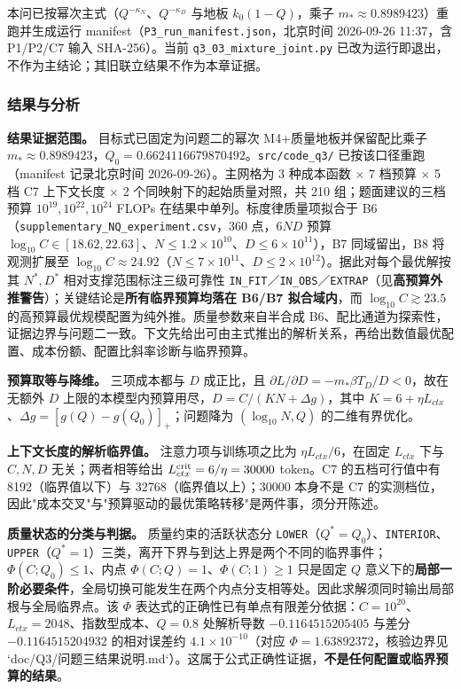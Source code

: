 本问已按幂次主式（$Q^{-\kappa_N}$、$Q^{-\kappa_D}$ 与地板 $k_0(1-Q)$，乘子 $m_*\approx0.8989423$）重跑并生成运行 manifest（\texttt{P3\_run\_manifest.json}，北京时间 2026-09-26 11:37，含 P1/P2/C7 输入 SHA-256）。当前 \texttt{q3\_03\_mixture\_joint.py} 已改为运行即退出，不作为主结论；其旧联立结果不作为本章证据。

\subsubsection{结果与分析}
\label{sec:5.4.3}

\textbf{结果证据范围。} 目标式已固定为问题二的幂次 M4+质量地板并保留配比乘子 $m_*\approx0.8989423$，$Q_0=0.6624116679870492$。\texttt{src/code\_q3/} 已按该口径重跑（manifest 记录北京时间 2026-09-26）。主网格为 3 种成本函数 $\times$ 7 档预算 $\times$ 5 档 C7 上下文长度 $\times$ 2 个同映射下的起始质量对照，共 210 组；题面建议的三档预算 $10^{19},10^{22},10^{24}$ FLOPs 在结果中单列。标度律质量项拟合于 B6（\texttt{supplementary\_NQ\_experiment.csv}，360 点，$6ND$ 预算 $\log_{10}C\in[18.62,22.63]$、$N\le1.2\times10^{10}$、$D\le6\times10^{11}$），B7 同域留出，B8 将观测扩展至 $\log_{10}C\approx24.92$（$N\le7\times10^{11}$、$D\le2\times10^{12}$）。据此对每个最优解按其 $N^*,D^*$ 相对支撑范围标注三级可靠性 \texttt{IN\_FIT}／\texttt{IN\_OBS}／\texttt{EXTRAP}（见\textbf{高预算外推警告}）；关键结论是\textbf{所有临界预算均落在 B6/B7 拟合域内}，而 $\log_{10}C\gtrsim23.5$ 的高预算最优规模配置为纯外推。质量参数来自半合成 B6、配比通道为探索性，证据边界与问题二一致。下文先给出可由主式推出的解析关系，再给出数值最优配置、成本份额、配置比斜率诊断与临界预算。

\textbf{预算取等与降维。} 三项成本都与 $D$ 成正比，且 $\partial L/\partial D=-m_*\beta T_D/D<0$，故在无额外 $D$ 上限的本模型内预算用尽，$D=C/(KN+\Delta g)$，其中 $K=6+\eta L_{ctx}$、$\Delta g=[g(Q)-g(Q_0)]_+$；问题降为 $(\log_{10}N,Q)$ 的二维有界优化。

\textbf{上下文长度的解析临界值。} 注意力项与训练项之比为 $\eta L_{ctx}/6$，在固定 $L_{ctx}$ 下与 $C,N,D$ 无关；两者相等给出 $L_{ctx}^{\rm crit}=6/\eta=30000$ token。C7 的五档可行值中有 8192（临界值以下）与 32768（临界值以上）；30000 本身不是 C7 的实测档位，因此"成本交叉"与"预算驱动的最优策略转移"是两件事，须分开陈述。

\textbf{质量状态的分类与判据。} 质量约束的活跃状态分 \texttt{LOWER}（$Q^*=Q_0$）、\texttt{INTERIOR}、\texttt{UPPER}（$Q^*=1$）三类，离开下界与到达上界是两个不同的临界事件；$\Phi(C;Q_0)\le1$、内点 $\Phi(C;Q)=1$、$\Phi(C;1)\ge1$ 只是固定 $Q$ 意义下的\textbf{局部一阶必要条件}，全局切换可能发生在两个内点分支相等处。因此求解须同时输出局部根与全局临界点。该 $\Phi$ 表达式的正确性已有单点有限差分依据：$C=10^{20}$、$L_{ctx}=2048$、指数型成本、$Q=0.8$ 处解析导数 $-0.1164515205405$ 与差分 $-0.1164515204932$ 的相对误差约 $4.1\times10^{-10}$（对应 $\Phi=1.63892372$，核验边界见 `doc/Q3/问题三结果说明.md`）。这属于公式正确性证据，\textbf{不是任何配置或临界预算的结果}。

